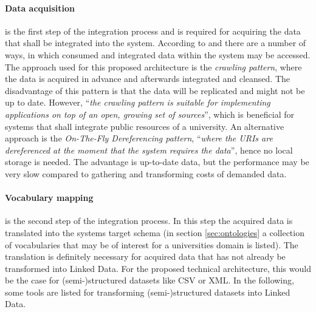 \documentclass{article}
\begin{document}
\paragraph{Data acquisition} is the first step of the integration process and is required for acquiring the data that shall be integrated into the system. According to \citet{simperl_using_2013} and \citet{heath_linked_2011} there are a number of ways, in which consumed and integrated data within the system may be accessed. The approach used for this proposed architecture is the \textit{crawling pattern}, where the data is acquired in advance and afterwards integrated and cleansed. The disadvantage of this pattern is that the data will be replicated and might not be up to date. However, ``\textit{the crawling pattern is suitable for implementing applications on top of an open, growing set of sources}''\cite{heath_linked_2011}, which is beneficial for systems that shall integrate public resources of a university. An alternative approach is the \textit{On-The-Fly Dereferencing pattern}, ``\textit{where the URIs are dereferenced at the moment that the system requires the data}'', hence no local storage is needed. The advantage is up-to-date data, but the performance may be very slow compared to gathering and transforming costs of demanded data.


\paragraph{Vocabulary mapping} is the second step of the integration process. In this step the acquired data is translated into the systems target schema (in section \ref{sec:ontologies} a collection of vocabularies that may be of interest for a universities domain is listed). The translation is definitely necessary for acquired data that has not already be transformed into Linked Data. For the proposed technical architecture, this would be the case for (semi-)structured datasets like CSV or XML. In the following, some tools are listed for transforming (semi-)structured datasets into Linked Data.
\end{document}

